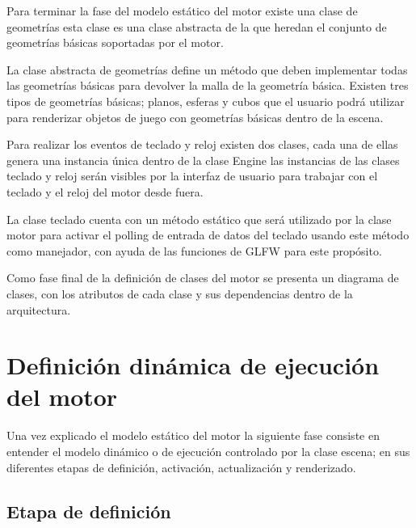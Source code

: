 \documentclass[a4paper, 17pt]{book}
\begin{document}
\vspace{1mm} %

Para terminar la fase del modelo estático del motor existe una clase de geometrías esta clase es una clase abstracta de la que heredan el
conjunto de geometrías básicas soportadas por el motor. 

\vspace{1mm} %

La clase abstracta de geometrías define un método que deben implementar todas las geometrías básicas para devolver la malla de la geometría
básica. Existen tres tipos de geometrías básicas; planos, esferas y cubos que el usuario podrá utilizar para renderizar objetos de juego con
geometrías básicas dentro de la escena.

\vspace{1mm} %

Para realizar los eventos de teclado y reloj existen dos clases, cada una de ellas genera una instancia única dentro de la clase Engine las
instancias de las clases teclado y reloj serán visibles por la interfaz de usuario para trabajar con el teclado y el reloj del motor desde fuera.

\vspace{1mm} %

La clase teclado cuenta con un método estático que será utilizado por la clase motor para activar el polling de entrada de datos del teclado
usando este método como manejador, con ayuda de las funciones de GLFW para este propósito.

\vspace{1mm} %

Como fase final de la definición de clases del motor se presenta un diagrama de clases, con los atributos de cada clase y sus dependencias
dentro de la arquitectura.

\section{Definición dinámica de ejecución del motor}
\label{sec:Dinamica}

Una vez explicado el modelo estático del motor la siguiente fase consiste en entender el modelo dinámico o de ejecución controlado por la
clase escena; en sus diferentes etapas de definición, activación, actualización y renderizado.

\subsection{Etapa de definición}
\label{subsec:definicion}
\end{document}
